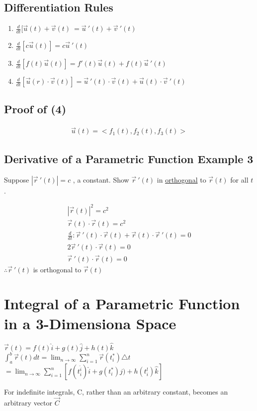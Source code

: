 \documentclass[12pt]{article}
\begin{document}
\subsection{Differentiation Rules}
\begin{enumerate}
	\item \(\frac{d}{dt}[\vec{u} (t)  +\vec{v} (t)\ = \vec{u} \ '(t) + \vec{v}\ '(t)   \) 
	\item \(\frac{d}{dt}[c \vec{u} (t)] = c \vec{u} \ '(t)  \) 
	\item \(\frac{d}{dt}[f(t) \vec{u}(t)] = f'(t)\vec{u} (t) + f(t)\vec{u} \ '(t)    \) 
	\item \(\frac{d}{dt}[\vec{u} (r)\cdot \vec{v} (t)] = \vec{u} \ '(t)\cdot \vec{v} (t)+ \vec{u} (t) \cdot \vec{v} \ '(t)       \) 
\end{enumerate}

\subsection{Proof of (4)}
\begin{align}
	\vec{u} (t)	= <f_1(t),f_2(t),f_3(t)> 
\end{align}
\subsection{Derivative of a Parametric Function Example 3}
Suppose \(|\vec{r} \ '(t)| = c\) , a constant. Show \(\vec{r} \ '(t) \) in \underline{orthogonal} to \(\vec{r} (t) \) for all \(t\).

\begin{align}
	|\vec{r} (t)|^2 = c^2\\%
	\vec{r} (t)	\cdot \vec{r} (t) = c^2\\%
	\frac{d}{dt}: \vec{r} \ '(t) \cdot \vec{r} (t) + \vec{r} (t) \cdot \vec{r} \ '(t) = 0 \\%
	2 \vec{r} \ '(t) \cdot \vec{r} (t) = 0\\%
	\vec{r} \ '(t) \cdot \vec{r} (t) = 0
\end{align}
\(\therefore \vec{r} \ '(t) \) is orthogonal to \(\vec{r} (t) \) 

\section{Integral of a Parametric Function in a 3-Dimensiona Space}
\(\vec{r} (t) = f(t)\hat{i} + g(t) \hat{j} + h(t) \hat{k} \) \\%
\(\int_{a}^{b} \vec{r} (t)dt = \lim_{n \to \infty} \sum_{i=1}^{n} \vec{r} (t^*_i)\triangle t\)\\%
\(=\lim_{n \to \infty} \sum_{i=1}^{n} [f(t^{\hat{i}}_i)\hat{i}+g(t^*_i)\hat{j}) + h(t^l_i)\hat{k}]\) %

For indefinite integrals, C, rather than an arbitrary constant, becomes an arbitrary vector \(\vec{C}  \) 
\end{document}
